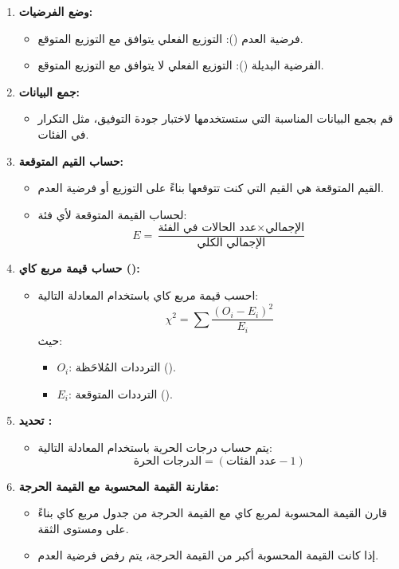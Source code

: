 \begin{enumerate}
	\item \textbf{وضع الفرضيات:}
	\begin{itemize}
		\item فرضية العدم (): التوزيع الفعلي يتوافق مع التوزيع المتوقع.
		\item الفرضية البديلة (): التوزيع الفعلي لا يتوافق مع التوزيع المتوقع.
	\end{itemize}
	
	\item \textbf{جمع البيانات:}
	\begin{itemize}
		\item قم بجمع البيانات المناسبة التي ستستخدمها لاختبار جودة التوفيق، مثل التكرار في الفئات.
	\end{itemize}
	
	\item \textbf{حساب القيم المتوقعة:}
	\begin{itemize}
		\item القيم المتوقعة هي القيم التي كنت تتوقعها بناءً على التوزيع أو فرضية العدم.
		\item لحساب القيمة المتوقعة لأي فئة:
		\[
		E = \frac{\text{عدد الحالات في الفئة} \times \text{الإجمالي}}{\text{الإجمالي الكلي}}
		\]
	\end{itemize}
	
	\item \textbf{حساب قيمة مربع كاي ():}
	\begin{itemize}
		\item احسب قيمة مربع كاي باستخدام المعادلة التالية:
		\[
		\chi^2 = \sum \frac{(O_i - E_i)^2}{E_i}
		\]
		حيث:
		\begin{itemize}
			\item \(O_i\): الترددات المُلاحَظة ().
			\item \(E_i\): الترددات المتوقعة ().
		\end{itemize}
	\end{itemize}
	
	\item \textbf{تحديد :}
	\begin{itemize}
		\item يتم حساب درجات الحرية باستخدام المعادلة التالية:
		\[
		\text{الدرجات الحرة} = (\text{عدد الفئات} - 1)
		\]
	\end{itemize}
	
	\item \textbf{مقارنة القيمة المحسوبة مع القيمة الحرجة:}
	\begin{itemize}
		\item قارن القيمة المحسوبة لمربع كاي مع القيمة الحرجة من جدول مربع كاي بناءً على  ومستوى الثقة.
		\item إذا كانت القيمة المحسوبة أكبر من القيمة الحرجة، يتم رفض فرضية العدم.
	\end{itemize}
	

\end{enumerate}

